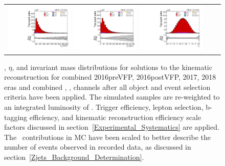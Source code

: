 \begin{figure}[htb]
    \begin{center}
        \begin{tabular}{ccc}
            \includegraphics[width=0.325\textwidth]{fig_fullRun2UL/controlplots/combined/HypTTBarMass.pdf}
            \includegraphics[width=0.325\textwidth]{fig_fullRun2UL/controlplots/combined/HypTTBarpT.pdf} 
            \includegraphics[width=0.325\textwidth]{fig_fullRun2UL/controlplots/combined/HypTTBarRapidity.pdf} \\
        \end{tabular}
        \caption{\footnotesize \pT, $\eta$, and invariant mass distributions for \ttbar solutions to the kinematic reconstruction for combined 2016preVFP, 2016postVFP, 2017, 2018 eras and combined \ee, \emu, \mumu channels after all object and event selection criteria have been applied.
        The simulated samples are re-weighted to an integrated luminosity of \lumivalueRuniiUL.
        Trigger efficiency, lepton selection, b-tagging efficiency, and kinematic reconstruction efficiency scale factors discussed in section~\ref{Experimental_Systematics} are applied.
        The \zjets\ contributions in MC have been scaled to better describe the number of events observed in recorded data, as discussed in section~\ref{Zjets_Background_Determination}.
        }
    \end{center}
\end{figure}

\clearpage
